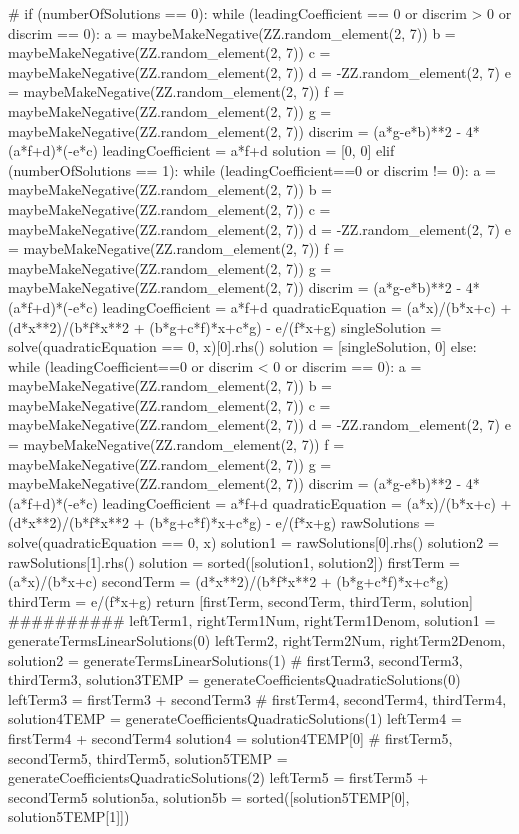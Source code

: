 \documentclass{ximera}
\begin{document}
\begin{sagesilent}
   #
    if (numberOfSolutions == 0):
        while (leadingCoefficient == 0 or discrim > 0 or discrim == 0):
            a = maybeMakeNegative(ZZ.random_element(2, 7))
            b = maybeMakeNegative(ZZ.random_element(2, 7))
            c = maybeMakeNegative(ZZ.random_element(2, 7))
            d = -ZZ.random_element(2, 7)
            e = maybeMakeNegative(ZZ.random_element(2, 7))
            f = maybeMakeNegative(ZZ.random_element(2, 7))
            g = maybeMakeNegative(ZZ.random_element(2, 7))
            discrim = (a*g-e*b)**2 - 4*(a*f+d)*(-e*c)
            leadingCoefficient = a*f+d
        solution = [0, 0]
    elif (numberOfSolutions == 1):
        while (leadingCoefficient==0 or discrim != 0):
            a = maybeMakeNegative(ZZ.random_element(2, 7))
            b = maybeMakeNegative(ZZ.random_element(2, 7))
            c = maybeMakeNegative(ZZ.random_element(2, 7))
            d = -ZZ.random_element(2, 7)
            e = maybeMakeNegative(ZZ.random_element(2, 7))
            f = maybeMakeNegative(ZZ.random_element(2, 7))
            g = maybeMakeNegative(ZZ.random_element(2, 7))
            discrim = (a*g-e*b)**2 - 4*(a*f+d)*(-e*c)
            leadingCoefficient = a*f+d
        quadraticEquation = (a*x)/(b*x+c) + (d*x**2)/(b*f*x**2 + (b*g+c*f)*x+c*g) - e/(f*x+g)
        singleSolution = solve(quadraticEquation == 0, x)[0].rhs()
        solution = [singleSolution, 0]
    else:
        while (leadingCoefficient==0 or discrim < 0 or discrim == 0):
            a = maybeMakeNegative(ZZ.random_element(2, 7))
            b = maybeMakeNegative(ZZ.random_element(2, 7))
            c = maybeMakeNegative(ZZ.random_element(2, 7))
            d = -ZZ.random_element(2, 7)
            e = maybeMakeNegative(ZZ.random_element(2, 7))
            f = maybeMakeNegative(ZZ.random_element(2, 7))
            g = maybeMakeNegative(ZZ.random_element(2, 7))
            discrim = (a*g-e*b)**2 - 4*(a*f+d)*(-e*c)
            leadingCoefficient = a*f+d
        quadraticEquation = (a*x)/(b*x+c) + (d*x**2)/(b*f*x**2 + (b*g+c*f)*x+c*g) - e/(f*x+g)
        rawSolutions = solve(quadraticEquation == 0, x)
        solution1 = rawSolutions[0].rhs()
        solution2 = rawSolutions[1].rhs()
        solution = sorted([solution1, solution2])
    firstTerm = (a*x)/(b*x+c)
    secondTerm = (d*x**2)/(b*f*x**2 + (b*g+c*f)*x+c*g)
    thirdTerm = e/(f*x+g)
    return [firstTerm, secondTerm, thirdTerm, solution]
##########
leftTerm1, rightTerm1Num, rightTerm1Denom, solution1 = generateTermsLinearSolutions(0)
leftTerm2, rightTerm2Num, rightTerm2Denom, solution2 = generateTermsLinearSolutions(1)
#
firstTerm3, secondTerm3, thirdTerm3, solution3TEMP = generateCoefficientsQuadraticSolutions(0)
leftTerm3 = firstTerm3 + secondTerm3
#
firstTerm4, secondTerm4, thirdTerm4, solution4TEMP = generateCoefficientsQuadraticSolutions(1)
leftTerm4 = firstTerm4 + secondTerm4
solution4 = solution4TEMP[0]
#
firstTerm5, secondTerm5, thirdTerm5, solution5TEMP = generateCoefficientsQuadraticSolutions(2)
leftTerm5 = firstTerm5 + secondTerm5
solution5a, solution5b = sorted([solution5TEMP[0], solution5TEMP[1]])
\end{sagesilent}
\end{document}
